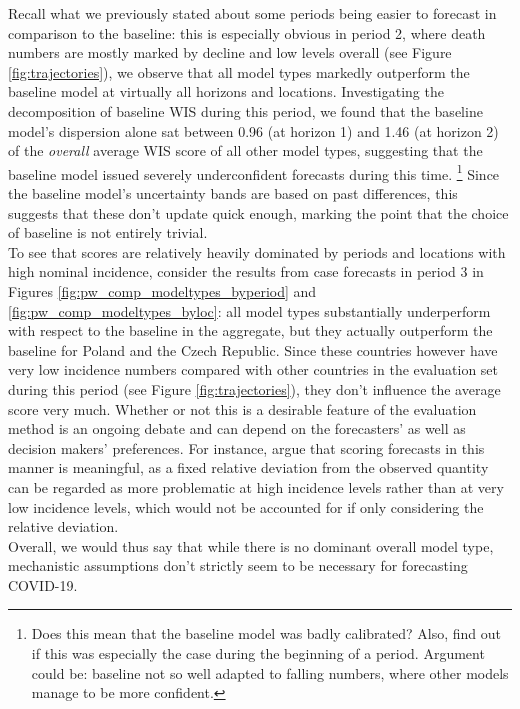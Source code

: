 Recall what we previously stated about some periods being easier to forecast in comparison to the baseline: this is especially obvious in period 2, where death numbers are mostly marked by decline and low levels overall (see Figure \ref{fig:trajectories}), we observe that all model types markedly outperform the baseline model at virtually all horizons and locations. Investigating the decomposition of baseline WIS during this period, we found that the baseline model's dispersion alone sat between 0.96 (at horizon 1) and 1.46 (at horizon 2) of the \textit{overall} average WIS score of all other model types, suggesting that the baseline model issued severely underconfident forecasts during this time. \footnote{Does this mean that the baseline model was badly calibrated? Also, find out if this was especially the case during the beginning of a period. Argument could be: baseline not so well adapted to falling numbers, where other models manage to be more confident.} Since the baseline model's uncertainty bands are based on past differences, this suggests that these don't update quick enough, marking the point that the choice of baseline is not entirely trivial. \\
To see that scores are relatively heavily dominated by periods and locations with high nominal incidence, consider the results from case forecasts in period 3 in Figures \ref{fig:pw_comp_modeltypes_byperiod} and \ref{fig:pw_comp_modeltypes_byloc}: all model types substantially underperform with respect to the baseline in the aggregate, but they actually outperform the baseline for Poland and the Czech Republic. Since these countries however have very low incidence numbers compared with other countries in the evaluation set during this period (see Figure \ref{fig:trajectories}), they don't influence the average score very much. Whether or not this is a desirable feature of the evaluation method is an ongoing debate and can depend on the forecasters' as well as decision makers' preferences. For instance, \cite{bracher_evaluating_2021} argue that scoring forecasts in this manner is meaningful, as a fixed relative deviation from the observed quantity can be regarded as more problematic at high incidence levels rather than at very low incidence levels, which would not be accounted for if only considering the relative deviation.\\  
Overall, we would thus say that while there is no dominant overall model type, mechanistic assumptions don't strictly seem to be necessary for forecasting COVID-19.\\
